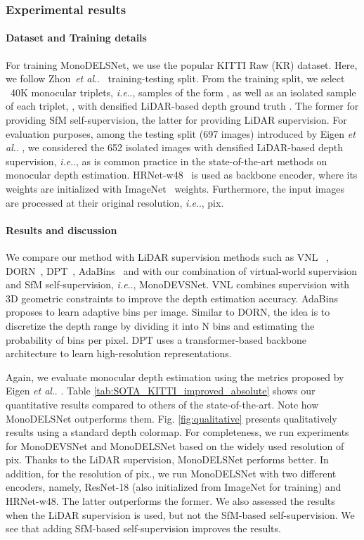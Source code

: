 \documentclass[journal]{IEEEtran}
\makeatletter
\DeclareRobustCommand\onedot{\futurelet\@let@token\@onedot}
\def\@onedot{\ifx\@let@token.\else.\null\fi\xspace}
\def\ie{\emph{i.e}\onedot} \def\Ie{\emph{I.e}\onedot}
\def\etal{\emph{et al}\onedot}
\newcommand{\Fig}[1]{Fig. \ref{fig:#1}}
\newcommand{\Tab}[1]{Table \ref{tab:#1}}
\makeatother
\begin{document}
\subsubsection{Experimental results}
\paragraph{Dataset and Training details}
For training MonoDELSNet, we use the popular KITTI Raw (KR) dataset. Here, we follow Zhou~{\etal}~\cite{Zhou:2017} training-testing split. From the training split, we select ~40K monocular triplets, {\ie}, samples of the form , as well as an isolated sample of each triplet, , with densified LiDAR-based depth ground truth  . The former for providing SfM self-supervision, the latter for providing LiDAR supervision. For evaluation purposes, among the testing split (697 images) introduced by Eigen {\etal} \cite{Eigen:2014}, we considered the 652 isolated images with densified LiDAR-based depth supervision, {\ie}, as is common practice in the state-of-the-art methods on monocular depth estimation. HRNet-w48~\cite{Wang:2020HrNet} is used as backbone encoder, where its weights are initialized with ImageNet~\cite{Deng:2009} weights. Furthermore, the input images are processed at their original resolution, {\ie},  pix.

\paragraph{Results and discussion}
We compare our method with LiDAR supervision methods such as VNL~\cite{Yin:2019} , DORN~\cite{Fu:2018DORN}, DPT~\cite{Ranftl:2021}, AdaBins~\cite{Bhat:2021} and with our combination of virtual-world supervision and SfM self-supervision, {\ie}, MonoDEVSNet. VNL combines supervision with 3D geometric constraints to improve the depth estimation accuracy. AdaBins proposes to learn adaptive bins per image. Similar to DORN, the idea is to discretize the depth range by dividing it into N bins and estimating the probability of bins per pixel. DPT uses a transformer-based backbone architecture to learn high-resolution representations.

Again, we evaluate monocular depth estimation using the metrics proposed by Eigen {\etal} \cite{Eigen:2014}. \Tab{SOTA_KITTI_improved_absolute} shows our quantitative results compared to others of the state-of-the-art. Note how MonoDELSNet outperforms them. \Fig{qualitative} presents qualitatively results using a standard depth colormap. For completeness, we run experiments for MonoDEVSNet and MonoDELSNet based on the widely used resolution of  pix. Thanks to the LiDAR supervision, MonoDELSNet performs better. In addition, for the resolution of  pix.,  we run MonoDELSNet with two different encoders, namely, ResNet-18 (also initialized from ImageNet for training) and HRNet-w48. The latter outperforms the former. We also assessed the results when the LiDAR supervision is used, but not the SfM-based self-supervision. We see that adding SfM-based self-supervision improves the results.
\end{document}
